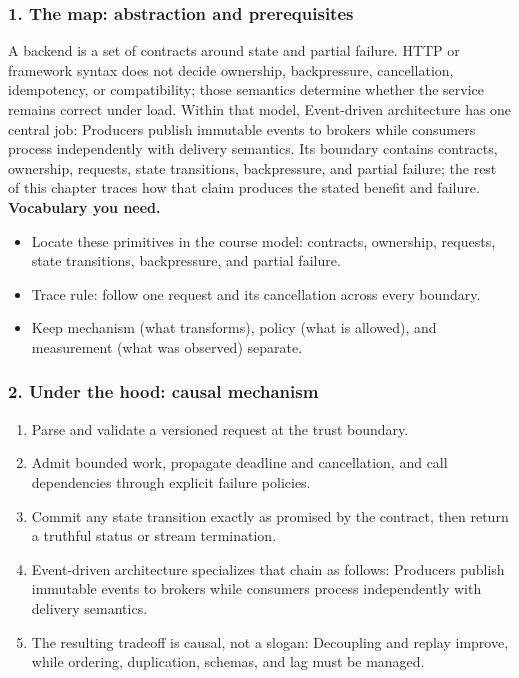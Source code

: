 \subsubsection*{1. The map: abstraction and prerequisites}
A backend is a set of contracts around state and partial failure. HTTP or framework syntax does not decide ownership, backpressure, cancellation, idempotency, or compatibility; those semantics determine whether the service remains correct under load.
Within that model, Event-driven architecture has one central job: Producers publish immutable events to brokers while consumers process independently with delivery semantics. Its boundary contains contracts, ownership, requests, state transitions, backpressure, and partial failure; the rest of this chapter traces how that claim produces the stated benefit and failure.
\textbf{Vocabulary you need.}\begin{itemize}
\item Locate these primitives in the course model: contracts, ownership, requests, state transitions, backpressure, and partial failure.
\item Trace rule: follow one request and its cancellation across every boundary.
\item Keep mechanism (what transforms), policy (what is allowed), and measurement (what was observed) separate.
\end{itemize}
\subsubsection*{2. Under the hood: causal mechanism}\begin{enumerate}
\item Parse and validate a versioned request at the trust boundary.
\item Admit bounded work, propagate deadline and cancellation, and call dependencies through explicit failure policies.
\item Commit any state transition exactly as promised by the contract, then return a truthful status or stream termination.
\item Event-driven architecture specializes that chain as follows: Producers publish immutable events to brokers while consumers process independently with delivery semantics.
\item The resulting tradeoff is causal, not a slogan: Decoupling and replay improve, while ordering, duplication, schemas, and lag must be managed.
\end{enumerate}
